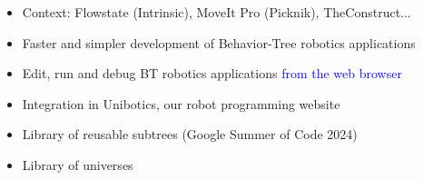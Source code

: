 \documentclass[notes,slidesec,a4]{seminar}
\begin{document}
\begin{hslide}
\begin{itemize}
\item Context: Flowstate (Intrinsic), MoveIt Pro (Picknik), TheConstruct...
\item Faster and simpler development of Behavior-Tree robotics applications
\item Edit, run and debug BT robotics applications \textcolor{blue}{from the web browser}
  \end{itemize}
  \vspace{1cm}  
  \begin{itemize}
  \item Integration in Unibotics, our robot programming website
  \item Library of reusable subtrees (Google Summer of Code 2024)
  \item Library of universes
  \end{itemize}
\end{hslide}
\end{document}
